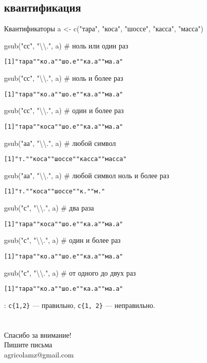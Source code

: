 \subsection{квантификация}
\begin{frame}[fragile]{Квантификаторы}
a <- c("тара"{}, "коса"{}, "шоссе"{}, "касса"{}, "масса")
\begin{itemize}
\mytem gsub("сс{\color{red!13!blue}{?}}"{}, "\textbackslash\textbackslash."{}, a) \hfill \# ноль или один раз
\scriptsize
\begin{alltt}
[1] "тара" "ко.а" "шо.е" "ка.а" "ма.а"
\end{alltt}
\normalsize
\mytem gsub("сс{\color{red!13!blue}{*}}"{}, "\textbackslash\textbackslash."{}, a) \hfill \# ноль и более раз
\scriptsize
\begin{alltt}
[1] "тара" "ко.а" "шо.е" "ка.а" "ма.а"
\end{alltt}
\normalsize
\mytem gsub("сс{\color{red!13!blue}{+}}"{}, "\textbackslash\textbackslash."{}, a) \hfill \# один и более раз
\scriptsize
\begin{alltt}
[1] "тара" "коса" "шо.е" "ка.а" "ма.а"
\end{alltt}
\normalsize
\mytem gsub("а{\color{red!13!blue}{.}}а"{}, "\textbackslash\textbackslash."{}, a) \hfill \# любой символ
\scriptsize
\begin{alltt}
[1] "т."    "коса"  "шоссе" "касса" "масса"
\end{alltt}
\normalsize
\mytem gsub("а{\color{red!13!blue}{.*}}а"{}, "\textbackslash\textbackslash."{}, a) \hfill \# любой символ ноль и более раз
\scriptsize
\begin{alltt}
[1] "т."    "коса"  "шоссе" "к." "м."
\end{alltt}
\normalsize
\mytem gsub("с{}"{}, "\textbackslash\textbackslash."{}, a) \hfill \# два раза
\scriptsize
\begin{alltt}
[1] "тара"    "коса"  "шо.е" "ка.а" "ма.а"
\end{alltt}
\normalsize
\mytem gsub("с{}"{}, "\textbackslash\textbackslash."{}, a) \hfill \# один и более раз
\scriptsize
\begin{alltt}
[1] "тара"    "ко.а"  "шо.е" "ка.а" "ма.а"
\end{alltt}
\normalsize
\mytem gsub("с{}"{}, "\textbackslash\textbackslash."{}, a) \hfill \# от одного до двух раз
\scriptsize
\begin{alltt}
[1] "тара"    "ко.а"  "шо.е" "ка.а" "ма.а"
\end{alltt}
\normalsize
\end{itemize}
\vspace{-2mm}
{\color{red!13!blue}{Пробел}}: \scriptsize\verb*"с{1,2}"\normalsize{} — правильно, \scriptsize\verb*"с{1, 2}"\normalsize{} — неправильно.
\end{frame}
\section{}
\begin{frame}
{\huge Спасибо за внимание!\bigskip\\
\normalsize Пишите письма\\
agricolamz@gmail.com
\vspace{-130pt}}
\end{frame}

